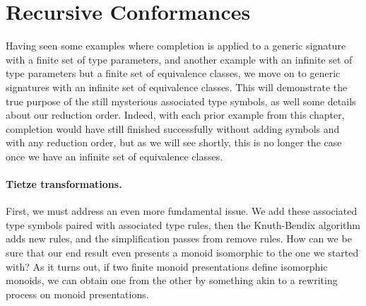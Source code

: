 \documentclass[../generics]{subfiles}
\begin{document}
\section{Recursive Conformances}\label{sec:recursive conformances redux}

Having seen some examples where completion is applied to a generic signature with a finite set of type parameters, and another example with an infinite set of type parameters but a finite set of equivalence classes, we move on to generic signatures with an infinite set of equivalence classes. This will demonstrate the true purpose of the still mysterious associated type symbols, as well some details about our reduction order. Indeed, with each prior example from this chapter, completion would have still finished successfully without adding symbols and with any reduction order, but as we will see shortly, this is no longer the case once we have an infinite set of equivalence classes.

\paragraph{Tietze transformations.} First, we must address an even more fundamental issue. We add these associated type symbols paired with associated type rules, then the Knuth-Bendix algorithm adds new rules, and the simplification passes from  remove rules. How can we be sure that our end result even presents a monoid isomorphic to the one we started with? As it turns out, if two finite monoid presentations define isomorphic monoids, we can obtain one from the other by something akin to a rewriting process on monoid presentations.
\end{document}
